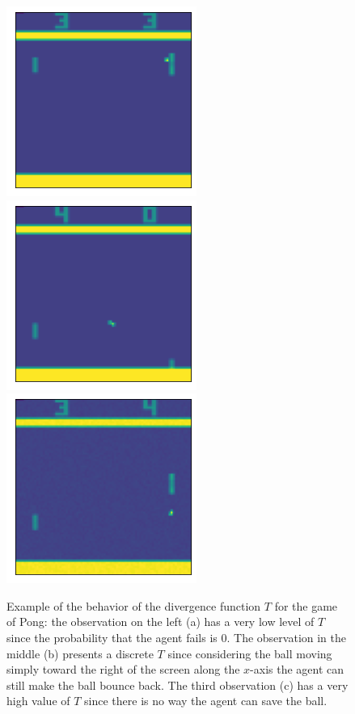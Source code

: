 \begin{figure}
  \centering
    {\includegraphics[width=0.32\linewidth]{images/Pong-Tfunc-good.png}}
    {\includegraphics[width=0.32\linewidth]{images/Pong-Tfunc-normal.png}}
    {\includegraphics[width=0.32\linewidth]{images/Pong-Tfunc-bad.png}}
  \caption{Example of the behavior of the divergence function \(T\) for the game of Pong: the observation on the left (a) has a very low level of \(T\) since the probability that the agent fails is 0. The observation in the middle (b) presents a discrete \(T\) since considering the ball moving simply toward the right of the screen along the \(x\)-axis the agent can still make the ball bounce back. The third observation (c) has a very high value of \(T\) since there is no way the agent can save the ball.}
  \label{figure:t-func}
\end{figure}

